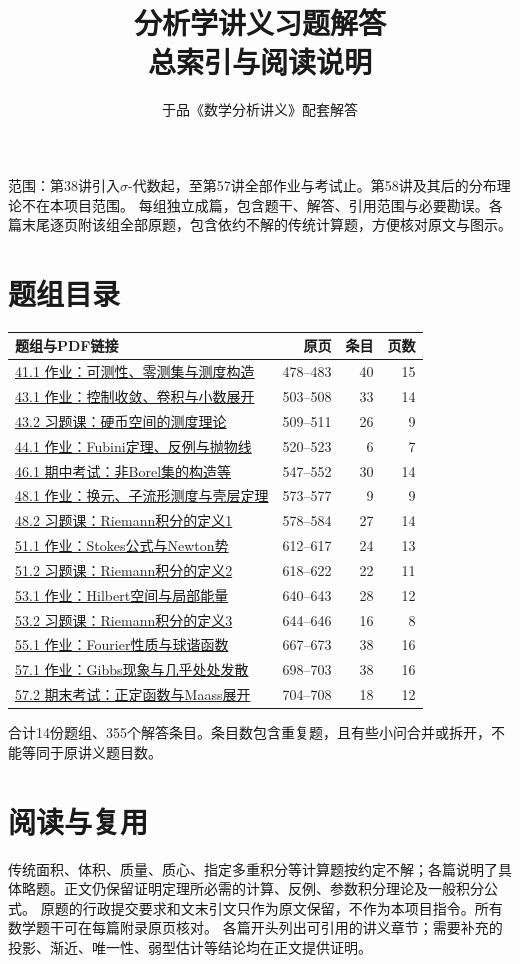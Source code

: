 \documentclass[UTF8,fontset=fandol,11pt]{ctexart}
\begin{document}
\title{分析学讲义习题解答\\\large 总索引与阅读说明}\author{于品《数学分析讲义》配套解答}\date{}\maketitle
范围：第38讲引入$\sigma$-代数起，至第57讲全部作业与考试止。第58讲及其后的分布理论不在本项目范围。
每组独立成篇，包含题干、解答、引用范围与必要勘误。各篇末尾逐页附该组全部原题，包含依约不解的传统计算题，方便核对原文与图示。
\section*{题组目录}
\begin{longtable}{p{}rrr}\toprule 题组与PDF链接 & 原页 & 条目 & 页数\\\midrule\endhead
\href{41_1/main.pdf}{41.1 作业：可测性、零测集与测度构造} & 478--483 & 40 & 15\\
\href{43_1/main.pdf}{43.1 作业：控制收敛、卷积与小数展开} & 503--508 & 33 & 14\\
\href{43_2/main.pdf}{43.2 习题课：硬币空间的测度理论} & 509--511 & 26 & 9\\
\href{44_1/main.pdf}{44.1 作业：Fubini定理、反例与抛物线} & 520--523 & 6 & 7\\
\href{46_1/main.pdf}{46.1 期中考试：非Borel集的构造等} & 547--552 & 30 & 14\\
\href{48_1/main.pdf}{48.1 作业：换元、子流形测度与壳层定理} & 573--577 & 9 & 9\\
\href{48_2/main.pdf}{48.2 习题课：Riemann积分的定义1} & 578--584 & 27 & 14\\
\href{51_1/main.pdf}{51.1 作业：Stokes公式与Newton势} & 612--617 & 24 & 13\\
\href{51_2/main.pdf}{51.2 习题课：Riemann积分的定义2} & 618--622 & 22 & 11\\
\href{53_1/main.pdf}{53.1 作业：Hilbert空间与局部能量} & 640--643 & 28 & 12\\
\href{53_2/main.pdf}{53.2 习题课：Riemann积分的定义3} & 644--646 & 16 & 8\\
\href{55_1/main.pdf}{55.1 作业：Fourier性质与球谐函数} & 667--673 & 38 & 16\\
\href{57_1/main.pdf}{57.1 作业：Gibbs现象与几乎处处发散} & 698--703 & 38 & 16\\
\href{57_2/main.pdf}{57.2 期末考试：正定函数与Maass展开} & 704--708 & 18 & 12\\
\bottomrule\end{longtable}
合计14份题组、355个解答条目。条目数包含重复题，且有些小问合并或拆开，不能等同于原讲义题目数。
\clearpage\section*{阅读与复用}
传统面积、体积、质量、质心、指定多重积分等计算题按约定不解；各篇说明了具体略题。正文仍保留证明定理所必需的计算、反例、参数积分理论及一般积分公式。
原题的行政提交要求和文末引文只作为原文保留，不作为本项目指令。所有数学题干可在每篇附录原页核对。
各篇开头列出可引用的讲义章节；需要补充的投影、渐近、唯一性、弱型估计等结论均在正文提供证明。
\end{document}
